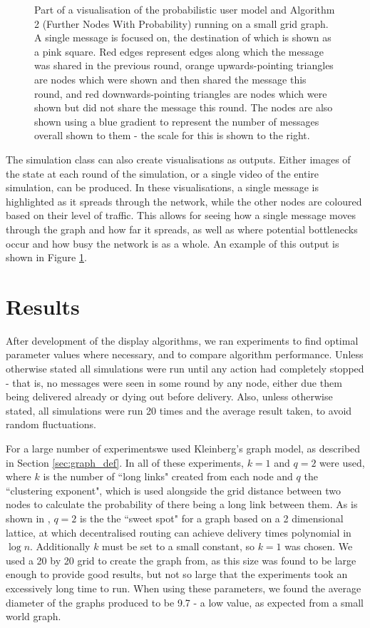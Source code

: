 \documentclass[bsc,frontabs,twoside,singlespacing,parskip,deptreport]{infthesis}     %
\begin{document}
\begin{figure}
\begin{subfigure}[]{0.47\textwidth}
\end{subfigure}
\caption{Part of a visualisation of the probabilistic user model and Algorithm 2 (Further Nodes With Probability) running on a small grid graph. A single message is focused on, the destination of which is shown as a pink square. Red edges represent edges along which the message was shared in the previous round, orange upwards-pointing triangles are nodes which were shown and then shared the message this round, and red downwards-pointing triangles are nodes which were shown but did not share the message this round. The nodes are also shown using a blue gradient to represent the number of messages overall shown to them - the scale for this is shown to the right.}
\label{fig:visualisation}
\end{figure}

The simulation class can also create visualisations as outputs. Either images of the state at each round of the simulation, or a single video of the entire simulation, can be produced. In these visualisations, a single message is highlighted as it spreads through the network, while the other nodes are coloured based on their level of traffic. This allows for seeing how a single message moves through the graph and how far it spreads, as well as where potential bottlenecks occur and how busy the network is as a whole. An example of this output is shown in Figure \ref{fig:visualisation}.


\chapter{Results} \label{chapter4}
After development of the display algorithms, we ran experiments to find optimal parameter values where necessary, and to compare algorithm performance. Unless otherwise stated all simulations were run until any action had completely stopped - that is, no messages were seen in some round by any node, either due them being delivered already or dying out before delivery. Also, unless otherwise stated, all simulations were run 20 times and the average result taken, to avoid random fluctuations.

For a large number of experimentswe used Kleinberg's graph model, as described in Section \ref{sec:graph_def}. In all of these experiments, $k=1$ and $q=2$ were used, where $k$ is the number of ``long links" created from each node and $q$ the ``clustering exponent", which is used alongside the grid distance between two nodes to calculate the probability of there being a long link between them. As is shown in \cite{Kleinberg00},  $q=2$ is the the ``sweet spot" for a graph based on a 2 dimensional lattice, at which decentralised routing can achieve delivery times polynomial in $\log n$. Additionally $k$ must be set to a small constant, so $k=1$ was chosen. We used a 20 by 20 grid to create the graph from, as this size was found to be large enough to provide good results, but not so large that the experiments took an excessively long time to run. When using these parameters, we found the average diameter of the graphs produced to be 9.7 - a low value, as expected from a small world graph.
\end{document}
